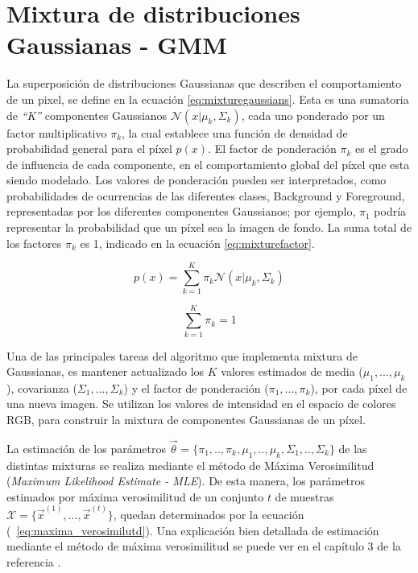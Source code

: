\section{Mixtura de distribuciones Gaussianas - GMM}


La superposición de distribuciones Gaussianas que describen el comportamiento de un pixel, se define en la ecuación \eqref{eq:mixturegaussians}. Esta es una sumatoria de \textit{``K''} componentes Gaussianos $\mathcal{N}( x | \mu_k , \Sigma_k)$, cada uno ponderado por un factor multiplicativo $\pi_k$, la cual establece una función de densidad de probabilidad general para el píxel $p(x)$. El factor de ponderación $\pi_k$ es el grado de influencia de cada componente, en el comportamiento global del píxel que esta siendo modelado. Los valores de ponderación pueden ser interpretados, como probabilidades de ocurrencias de las diferentes clases, Background y Foreground, representadas por los diferentes componentes Gaussianos; por ejemplo, $\pi_1$ podría representar la probabilidad que un píxel sea la imagen de fondo. La suma total de los factores $\pi_k$ es 1, indicado en la ecuación \eqref{eq:mixturefactor}. 

\begin{equation} \label{eq:mixturegaussians}
p(x) = \sum_{k=1}^{K} \pi_k \mathcal{N}( x | \mu_k , \Sigma_k)
\end{equation}

\begin{equation} \label{eq:mixturefactor}
\sum_{k=1}^{K} \pi_k = 1
\end{equation}


Una de las principales tareas del algoritmo que implementa mixtura de Gaussianas, es mantener actualizado los $K$ valores estimados de media ($\mu_1, ..., \mu_k$),  covarianza ($\Sigma_1, ..., \Sigma_k$) y el factor de ponderación ($\pi_1, ..., \pi_k$), por cada píxel de una nueva imagen. Se utilizan los valores de intensidad en el espacio de colores RGB, para construir la mixtura de componentes Gaussianas de un píxel.

La estimación de los parámetros $\vec{\theta} = \{\pi_1,..,\pi_k, \mu_1,..,\mu_k,\Sigma_1,..,\Sigma_k \} $ de las distintas mixturas se realiza mediante el método de Máxima Verosimilitud (\textit{Maximum Likelihood Estimate - MLE}). De esta manera, los parámetros estimados por máxima verosimilitud de un conjunto $t$ de muestras $\mathcal{X} = \{\vec{x}^{(1)}, ..., \vec{x}^{(t)}\}$, quedan determinados por la ecuación (~\ref{eq:maxima_verosimilutd}). Una explicación bien detallada de estimación mediante el método de máxima verosimilitud se puede ver en el capítulo 3 de la referencia \cite{duda_pattern_2000}.

